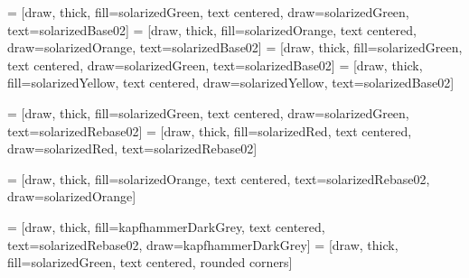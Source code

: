  = [draw, thick, fill=solarizedGreen, text centered, draw=solarizedGreen,
    text=solarizedBase02]
 = [draw, thick, fill=solarizedOrange, text centered, draw=solarizedOrange,
    text=solarizedBase02]
 = [draw, thick, fill=solarizedGreen, text centered, draw=solarizedGreen,
    text=solarizedBase02]
 = [draw, thick, fill=solarizedYellow, text centered, draw=solarizedYellow,
    text=solarizedBase02]

 = [draw, thick, fill=solarizedGreen, text centered, draw=solarizedGreen, text=solarizedRebase02]
 = [draw, thick, fill=solarizedRed, text centered, draw=solarizedRed, text=solarizedRebase02]

 = [draw, thick, fill=solarizedOrange, text centered, text=solarizedRebase02, draw=solarizedOrange]

 = [draw, thick, fill=kapfhammerDarkGrey, text centered, text=solarizedRebase02, draw=kapfhammerDarkGrey]
 = [draw, thick, fill=solarizedGreen, text centered, rounded corners]
